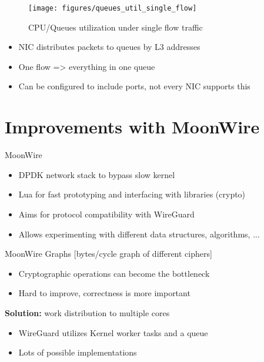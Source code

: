 \documentclass[NET,english]{tumbeamer}
\begin{document}
\begin{frame}
\begin{figure}
	\texttt{[image: figures/queues\_util\_single\_flow]}

	\caption{CPU/Queues utilization under single flow traffic}
	\label{fig:queuesutilsingleflow}
\end{figure}

\vspace*{-1em}
\begin{itemize}
	\item NIC distributes packets to queues by L3 addresses
	\item One flow => everything in one queue
	\item Can be configured to include ports, not every NIC supports this
\end{itemize}
\end{frame}

\section{Improvements with MoonWire}
\begin{frame}{MoonWire}
	\begin{itemize}
		\item DPDK network stack to bypass slow kernel
		\item Lua for fast prototyping and interfacing with libraries (crypto)
		\item Aims for protocol compatibility with WireGuard
		\item Allows experimenting with different data structures, algorithms, ...
	\end{itemize}
\end{frame}

\begin{frame}{MoonWire Graphs}
	 [bytes/cycle graph of different ciphers]

	\begin{itemize}
		\item Cryptographic operations can become the bottleneck
		\item Hard to improve, correctness is more important
	\end{itemize}
	
	\textbf{Solution:} work distribution to multiple cores
	\begin{itemize}
		\item WireGuard utilizes Kernel worker tasks and a queue		
		\item Lots of possible implementations
	\end{itemize}
	
\end{frame}
\end{document}
